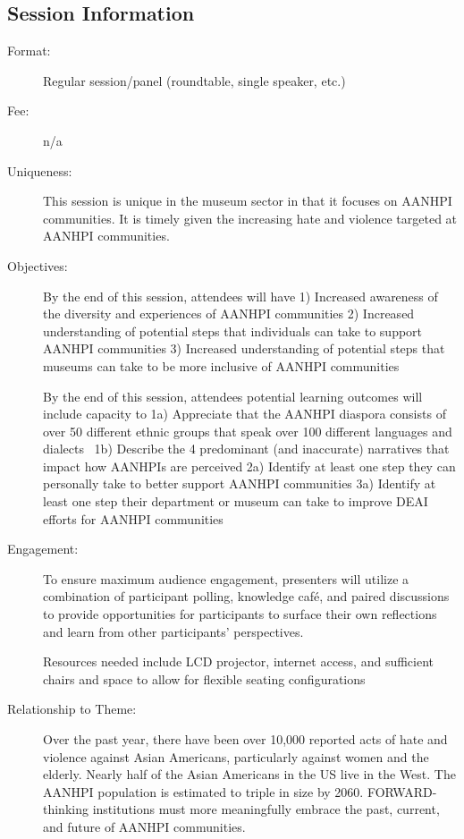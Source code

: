 \documentclass{report}
\begin{document}
              \subsection*{Session Information}
                \begin{description}
                  \item [Format:] Regular session/panel (roundtable, single speaker, etc.)
							    
								  \item [Fee:]n/a
							     
							    \item [Uniqueness:]This session is unique in the museum sector in that it focuses on AANHPI communities. It is timely given the increasing hate and violence targeted at AANHPI communities.
							    \item [Objectives:]By the end of this session, attendees will have
1)	Increased awareness of the diversity and experiences of AANHPI communities
2)	Increased understanding of potential steps that individuals can take to support AANHPI communities
3)	Increased understanding of potential steps that museums can take to be more inclusive of AANHPI communities

By the end of this session, attendees potential learning outcomes will include capacity to
1a) Appreciate that the AANHPI diaspora consists of over 50 different ethnic groups that speak over 100 different languages and dialects 
1b) Describe the 4 predominant (and inaccurate) narratives that impact how AANHPIs are perceived
2a) Identify at least one step they can personally take to better support AANHPI communities
3a) Identify at least one step their department or museum can take to improve DEAI efforts for AANHPI communities
							    \item [Engagement:]To ensure maximum audience engagement, presenters will utilize a combination of participant polling, knowledge café, and paired discussions to provide opportunities for participants to surface their own reflections and learn from other participants’ perspectives. 

Resources needed include LCD projector, internet access, and sufficient chairs and space to allow for flexible seating configurations
							    \item [Relationship to Theme:]Over the past year, there have been over 10,000 reported acts of hate and violence against Asian Americans, particularly against women and the elderly. Nearly half of the Asian Americans in the US live in the West. The AANHPI population is estimated to triple in size by 2060. FORWARD-thinking institutions must more meaningfully embrace the past, current, and future of AANHPI communities.
							    

\end{description}
\end{document}
